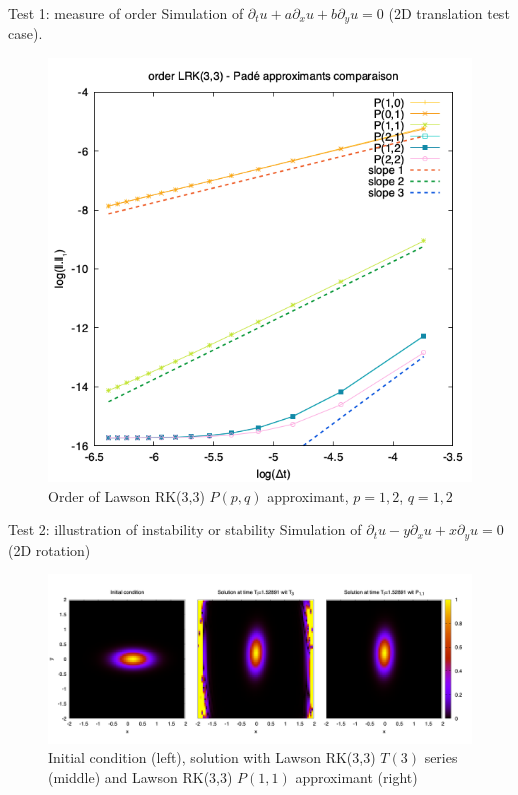 \documentclass{beamer}
\begin{document}
\begin{frame}{Test 1: measure of order}
  Simulation of $\partial_t u + a\partial_x u + b\partial_y u = 0$ (2D translation test case).
  \begin{figure}
    \centering
    \includegraphics[height=0.6\textheight]{img/order_lrk33pade}
    \caption{Order of Lawson RK(3,3) $P(p,q)$ approximant, $p=1,2$, $q=1,2$}
  \end{figure}
\end{frame}
\begin{frame}{Test 2: illustration of instability or stability}
  Simulation of $\partial_t u - y\partial_x u + x\partial_y u = 0$ (2D rotation)
  \begin{figure}
    \centering
    \includegraphics[width=\textwidth]{img/uf_t3p11}
    \caption{Initial condition (left), solution with Lawson RK(3,3) $T(3)$ series (middle) and Lawson RK(3,3) $P(1,1)$ approximant (right)}
  \end{figure}
\end{frame}
\end{document}
